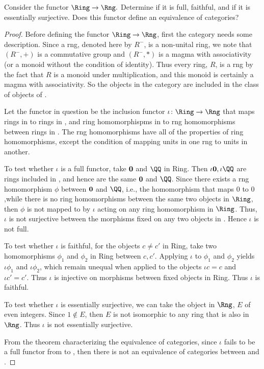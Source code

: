 \documentclass[main.tex]{subfiles}
\begin{document}
	\begin{lemma}
Consider the functor $\Ring\rightarrow \Rng.$ Determine if it is full, faithful, and if it is essentially surjective. Does this functor define an equivalence of categories?

	\end{lemma}


	\begin{proof}
Before defining the functor $\Ring\rightarrow \Rng$, first the category \Rng 
needs some description. Since a rng, denoted here by $R^-$, is a non-unital 
ring, we note that $(R^-,+)$ is a commutative group and $(R^-,*)$ is a magma 
with associativity (or a monoid without the condition of identity). Thus every 
ring, $R$, is a rng by the fact that $R$ is a monoid under multiplication, and 
this monoid is certainly a magma with associativity. So the objects in the 
category \Ring are included in the class of objects of \Rng. 

Let the functor in question be the inclusion functor $\iota\colon \Ring\rightarrow \Rng$ that maps rings in \Ring to rings in \Rng, and ring homomorphispms in \Ring to rng homomorphisms between rings in \Rng. The rng homomorphisms have all of the properties of ring homomorphisms, except the condition of mapping units in one rng to units in another. 

To test whether $\iota$ is a full functor, take $\bold 0$ and  $\QQ$ in 
Ring. Then $\iota \bold 0, \iota \QQ$ are rings included in \Rng, and hence 
are the same $\bold 0$ and  $\QQ$. Since there exists a rng homomorphism 
$\phi$ between $\bold 0$ and $\QQ$, i.e., the homomorphism that maps $0$ to 
$0$,while there is no ring homomorphisms between the same two objects in $\Ring$, then $\phi$ is not mapped to by $\iota$ acting on any ring 
homomorphism in $\Ring$.  Thus, $\iota$ is not surjective between the 
morphisms fixed on any two objects in \Ring. Hence $\iota$ is not full.

To test whether $\iota$ is faithful, for the objects $c \not= c'$ in Ring, take 
two homomorphisms $\phi_1$ and $\phi_2$ in Ring between $c, c'$. Applying 
$\iota$ to $\phi_1$ and $\phi_2$ yields $\iota \phi_1$ and $\iota \phi_2$, 
which remain unequal when applied to the objects $\iota c = c$ and $\iota c' = 
c'$. Thus $\iota$ is injective on morphisms between fixed objects in Ring. Thus 
$\iota$ is faithful.

To test whether $\iota$ is essentially surjective, we can take the object in 
$\Rng$, $E$ of even integers. Since $1 \notin E$, then $E$ is not 
isomorphic to any ring that is also in $\Rng$. Thus $\iota$ is not 
essentially surjective.

From the theorem characterizing the equivalence of categories, since $\iota$ fails to be a full functor from \Ring to \Rng, then there is not an equivalence of categories between \Ring and \Rng. 

	
\end{proof}	
	
	
\end{document}
